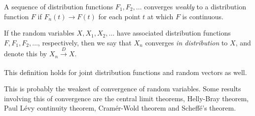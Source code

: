 \documentclass[12pt]{article}
\begin{document}
A sequence of distribution functions $F_1,F_2,\dots$ converges \emph{weakly} to a distribution 
function $F$ if $F_n(t)\rightarrow F(t)$ for each point $t$ at which $F$ is continuous. 

If the random variables $X,X_1,X_2,\dots$ have associated distribution functions 
$F,F_1,F_2,\dots$, respectively, then we say that $X_n$ converges \emph{in distribution} to 
$X$, and denote this by $X_n\xrightarrow[]{D} X$.

This definition holds for joint distribution functions and random vectors as well.

This is probably the weakest  of convergence of random variables. Some results involving this  of convergence 
are the central limit theorems, Helly-Bray theorem, Paul L\'evy continuity theorem, Cram\'er-Wold theorem and Scheff\'e's theorem.
\end{document}
